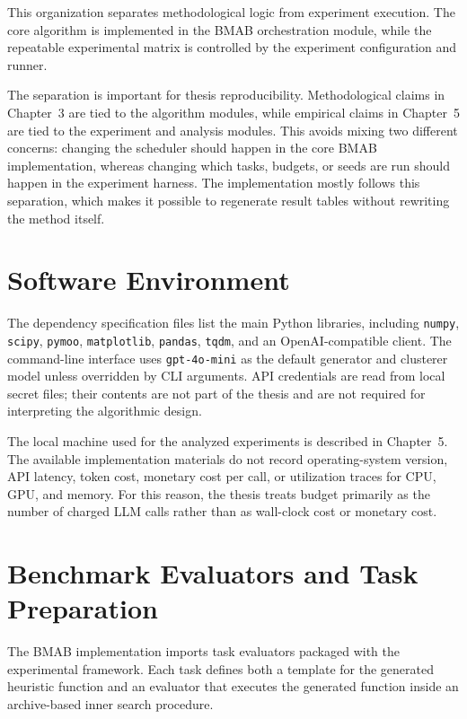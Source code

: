 \documentclass[../main.tex]{subfiles}
\begin{document}
This organization separates methodological logic from experiment execution. The core algorithm is implemented in the BMAB orchestration module, while the repeatable experimental matrix is controlled by the experiment configuration and runner.

The separation is important for thesis reproducibility. Methodological claims in Chapter~3 are tied to the algorithm modules, while empirical claims in Chapter~5 are tied to the experiment and analysis modules. This avoids mixing two different concerns: changing the scheduler should happen in the core BMAB implementation, whereas changing which tasks, budgets, or seeds are run should happen in the experiment harness. The implementation mostly follows this separation, which makes it possible to regenerate result tables without rewriting the method itself.

\section{Software Environment}

The dependency specification files list the main Python libraries, including \texttt{numpy}, \texttt{scipy}, \texttt{pymoo}, \texttt{matplotlib}, \texttt{pandas}, \texttt{tqdm}, and an OpenAI-compatible client. The command-line interface uses \texttt{gpt-4o-mini} as the default generator and clusterer model unless overridden by CLI arguments. API credentials are read from local secret files; their contents are not part of the thesis and are not required for interpreting the algorithmic design.

The local machine used for the analyzed experiments is described in Chapter~5. The available implementation materials do not record operating-system version, API latency, token cost, monetary cost per call, or utilization traces for CPU, GPU, and memory. For this reason, the thesis treats budget primarily as the number of charged LLM calls rather than as wall-clock cost or monetary cost.

\section{Benchmark Evaluators and Task Preparation}

The BMAB implementation imports task evaluators packaged with the experimental framework. Each task defines both a template for the generated heuristic function and an evaluator that executes the generated function inside an archive-based inner search procedure.
\end{document}
